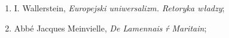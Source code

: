 \documentclass[a4paper,11pt]{article}
\begin{document}
\begin{enumerate}






\item I. Wallerstein, \textit{Europejski uniwersalizm. Retoryka władzy};

\item Abbé Jacques Meinvielle, \textit{De Lamennais ŕ Maritain};






















































\end{enumerate}
\end{document}
